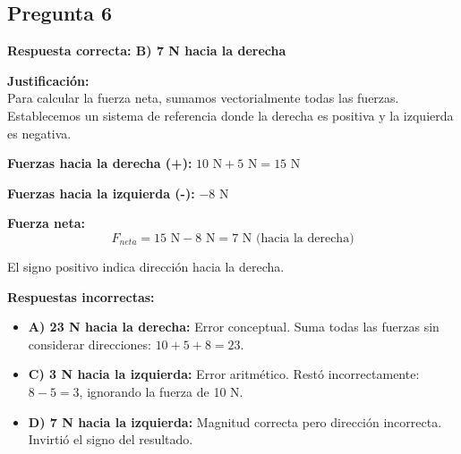 \begin{respuestabox}
\subsection{Pregunta 6}
\textcolor{verdecorrecto}{\textbf{Respuesta correcta: B) 7 N hacia la derecha}}

\textbf{Justificación:}\\
Para calcular la fuerza neta, sumamos vectorialmente todas las fuerzas. Establecemos un sistema de referencia donde la derecha es positiva y la izquierda es negativa.

\textbf{Fuerzas hacia la derecha (+):} $10 \text{ N} + 5 \text{ N} = 15 \text{ N}$

\textbf{Fuerzas hacia la izquierda (-):} $-8 \text{ N}$

\textbf{Fuerza neta:}
$$F_{neta} = 15 \text{ N} - 8 \text{ N} = 7 \text{ N (hacia la derecha)}$$

El signo positivo indica dirección hacia la derecha.

\textbf{Respuestas incorrectas:}
\begin{itemize}
    \item \textbf{A) 23 N hacia la derecha:} Error conceptual. Suma todas las fuerzas sin considerar direcciones: $10 + 5 + 8 = 23$.
    \item \textbf{C) 3 N hacia la izquierda:} Error aritmético. Restó incorrectamente: $8 - 5 = 3$, ignorando la fuerza de 10 N.
    \item \textbf{D) 7 N hacia la izquierda:} Magnitud correcta pero dirección incorrecta. Invirtió el signo del resultado.
\end{itemize}
\end{respuestabox}
\newpage
